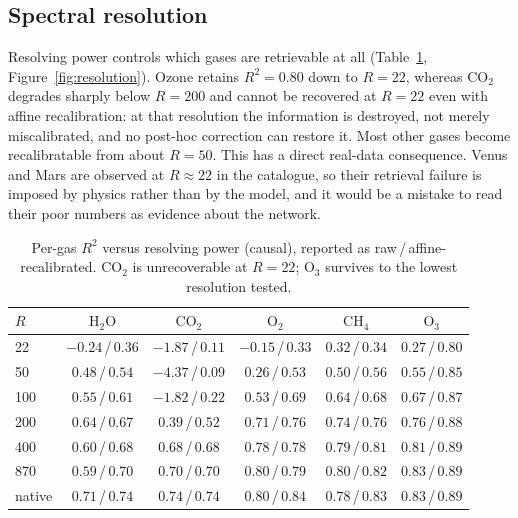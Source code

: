 \documentclass[11pt,twocolumn]{article}
\newcommand{\co}{$\mathrm{CO_2}$}
\newcommand{\ot}{$\mathrm{O_2}$}
\newcommand{\oth}{$\mathrm{O_3}$}
\newcommand{\ch}{$\mathrm{CH_4}$}
\newcommand{\wat}{$\mathrm{H_2O}$}
\begin{document}
\subsection{Spectral resolution}
\label{sec:resolution}

Resolving power controls which gases are retrievable at all
(Table~\ref{tab:resolution}, Figure~\ref{fig:resolution}). Ozone retains
$R^2{=}0.80$ down to $R{=}22$, whereas \co{} degrades sharply below $R{=}200$ and
cannot be recovered at $R{=}22$ even with affine recalibration: at that
resolution the information is destroyed, not merely miscalibrated, and no
post-hoc correction can restore it. Most other gases become recalibratable from
about $R{=}50$. This has a direct real-data consequence. Venus and Mars are
observed at $R\!\approx\!22$ in the catalogue, so their retrieval failure is
imposed by physics rather than by the model, and it would be a mistake to read
their poor numbers as evidence about the network.

\begin{table}[t]
\centering
\caption{Per-gas $R^2$ versus resolving power (causal), reported as raw\,/\,affine-recalibrated. \co{} is unrecoverable at $R{=}22$; \oth{} survives to the lowest resolution tested.}
\label{tab:resolution}
\small
\begin{tabular}{@{}lccccc@{}}
\toprule
$R$ & \wat & \co & \ot & \ch & \oth \\
\midrule
22     & $-0.24$\,/\,$0.36$ & $-1.87$\,/\,$0.11$ & $-0.15$\,/\,$0.33$ & $0.32$\,/\,$0.34$ & $0.27$\,/\,$0.80$ \\
50     & $0.48$\,/\,$0.54$  & $-4.37$\,/\,$0.09$ & $0.26$\,/\,$0.53$  & $0.50$\,/\,$0.56$ & $0.55$\,/\,$0.85$ \\
100    & $0.55$\,/\,$0.61$  & $-1.82$\,/\,$0.22$ & $0.53$\,/\,$0.69$  & $0.64$\,/\,$0.68$ & $0.67$\,/\,$0.87$ \\
200    & $0.64$\,/\,$0.67$  & $0.39$\,/\,$0.52$  & $0.71$\,/\,$0.76$  & $0.74$\,/\,$0.76$ & $0.76$\,/\,$0.88$ \\
400    & $0.60$\,/\,$0.68$  & $0.68$\,/\,$0.68$  & $0.78$\,/\,$0.78$  & $0.79$\,/\,$0.81$ & $0.81$\,/\,$0.89$ \\
870    & $0.59$\,/\,$0.70$  & $0.70$\,/\,$0.70$  & $0.80$\,/\,$0.79$  & $0.80$\,/\,$0.82$ & $0.83$\,/\,$0.89$ \\
native & $0.71$\,/\,$0.74$  & $0.74$\,/\,$0.74$  & $0.80$\,/\,$0.84$  & $0.78$\,/\,$0.83$ & $0.83$\,/\,$0.89$ \\
\bottomrule
\end{tabular}
\end{table}
\end{document}
